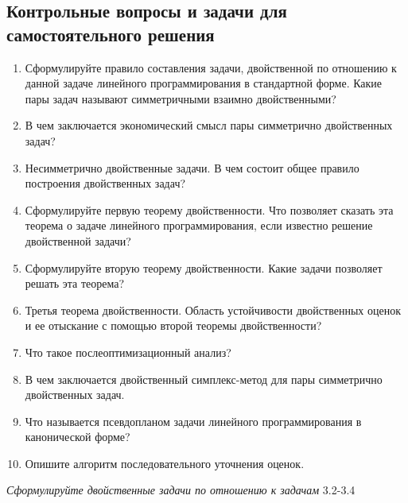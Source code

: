 \subsection*{Контрольные вопросы и задачи для самостоятельного решения}

\begin {enumerate}
\item Сформулируйте правило составления задачи, двойственной по отношению к данной задаче линейного программирования в стандартной форме. Какие пары задач называют симметричными взаимно двойственными?
\item В чем заключается экономический смысл пары симметрично двойственных задач?
\item Несимметрично двойственные задачи. В чем состоит общее правило построения двойственных задач?
\item Сформулируйте первую теорему двойственности. Что позволяет сказать эта теорема о задаче линейного программирования, если известно решение двойственной задачи?
\item Сформулируйте вторую теорему двойственности. Какие задачи позволяет решать эта теорема?
\item Третья теорема двойственности. Область устойчивости двойственных оценок и ее отыскание с помощью второй теоремы двойственности?
\item Что такое послеоптимизационный анализ?
\item В чем заключается двойственный симплекс-метод для пары симметрично двойственных задач.
\item Что называется псевдопланом задачи линейного программирования в канонической форме?
\item Опишите алгоритм последовательного уточнения оценок.
\end{enumerate}

\vspace{6pt}
\textit{Сформулируйте двойственные задачи по отношению к задачам} 3.2-3.4
\vspace{6pt}

\begin{minipage}{0.4\textwidth}
\end{minipage}
\hfill
\begin{minipage}{0.4\textwidth}
\end{minipage}

